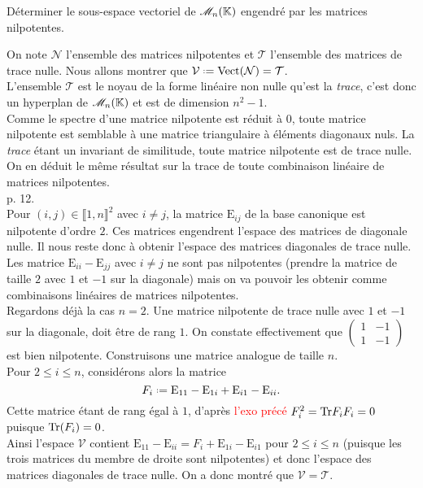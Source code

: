 \begin{exercice}
    Déterminer le sous-espace vectoriel de $\mathscr{M}_n(\mathbb{K})$ engendré par les matrices nilpotentes.
\end{exercice}

\begin{solution}
    On note $\mathcal{N}$ l'ensemble des matrices nilpotentes et $\mathcal{T}$ l'ensemble des matrices de trace nulle. Nous allons montrer que $\mathcal{V} \defeq \Vect(\mathcal{N}) = \mathcal{T}$. \\
    L'ensemble $\mathcal{T}$ est le noyau de la forme linéaire non nulle qu'est la \emph{trace}, c'est donc un hyperplan de $\mathscr{M}_n(\mathbb{K})$ et est de dimension $n^2-1$. \\
    Comme le spectre d'une matrice nilpotente est réduit à $0$, toute matrice nilpotente est semblable à une matrice triangulaire à éléments diagonaux nuls. La \emph{trace} étant un invariant de similitude, toute matrice nilpotente est de trace nulle. On en déduit le même résultat sur la trace de toute combinaison linéaire de matrices nilpotentes. \\
    \cite{oraux_x_ens_2} p. 12. \\
    Pour $(i,j) \in \llbracket 1, n \rrbracket^2$ avec $i \not= j$, la matrice $\mathrm{E}_{ij}$ de la base canonique est nilpotente d'ordre $2$. Ces matrices engendrent l'espace des matrices de diagonale nulle. Il nous reste donc à obtenir l'espace des matrices diagonales de trace nulle. Les matrice $\mathrm{E}_{ii} - \mathrm{E}_{jj}$ avec $i \not= j$ ne sont pas nilpotentes (prendre la matrice de taille $2$ avec $1$ et $-1$ sur la diagonale) mais on va pouvoir les obtenir comme combinaisons linéaires de matrices nilpotentes. \\
    Regardons déjà la cas $n = 2$. Une matrice nilpotente de trace nulle avec $1$ et $-1$ sur la diagonale, doit être de rang $1$. On constate effectivement que $\begin{pmatrix} 1 & -1 \\ 1 & -1 \end{pmatrix}$ est bien nilpotente. Construisons une matrice analogue de taille $n$. \\
    Pour $2 \leqslant i \leqslant n$, considérons alors la matrice
    $$F_i \defeq \mathrm{E}_{11} - \mathrm{E}_{1i} + \mathrm{E}_{i1} - \mathrm{E}_{ii}.$$
    Cette matrice étant de rang égal à $1$, d'après \textcolor{red}{l'exo précé} $F_i^2 = \mathrm{Tr}{F_i} F_i = 0$ puisque $\mathrm{Tr}(F_i) = 0$. \\
    Ainsi l'espace $\mathcal{V}$ contient $\mathrm{E}_{11}-\mathrm{E}_{ii} = F_i + \mathrm{E}_{1i} - \mathrm{E}_{i1}$ pour $2 \leqslant i \leqslant n$ (puisque les trois matrices du membre de droite sont nilpotentes) et donc l'espace des matrices diagonales de trace nulle. On a donc montré que $\mathcal{V} = \mathcal{T}$.
\end{solution}

